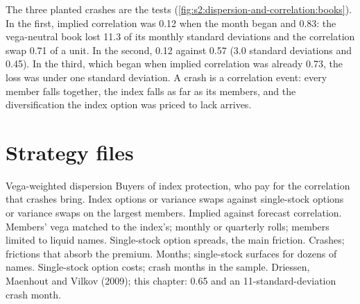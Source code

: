 The three planted crashes are the tests (\cref{fig:s2:dispersion-and-correlation:books}). In the first, implied correlation was 0.12 when the month began
and  0.83: the vega-neutral book lost 11.3 of its monthly standard deviations and the correlation swap 0.71 of a unit. In the second,
0.12 against 0.57 (3.0 standard deviations and 0.45). In the third, which began when implied correlation was already 0.73, the loss was under one
standard deviation. A crash is a correlation event: every member falls together, the index falls as far as its members, and the diversification the
index option was priced to lack arrives.

\begin{omfigure}

\label{fig:s2:dispersion-and-correlation:books}
\end{omfigure}

\section{Strategy files}

\begin{strategyfile}{Vega-weighted dispersion}\label{strat:s2:dispersion-and-correlation:vega}
 Buyers of index protection, who pay for the correlation that crashes bring.
 Index options or variance swaps against single-stock options or variance swaps on the largest members.
 Implied against forecast correlation.
 Members' vega matched to the index's; monthly or quarterly rolls; members limited to liquid names.
 Single-stock option spreads, the main friction.
 Crashes; frictions that absorb the premium.
 Months; single-stock surfaces for dozens of names.
 Single-stock option costs; crash months in the sample.
 Driessen, Maenhout and Vilkov (2009); this chapter: 0.65 and an 11-standard-deviation crash month.
\end{strategyfile}


